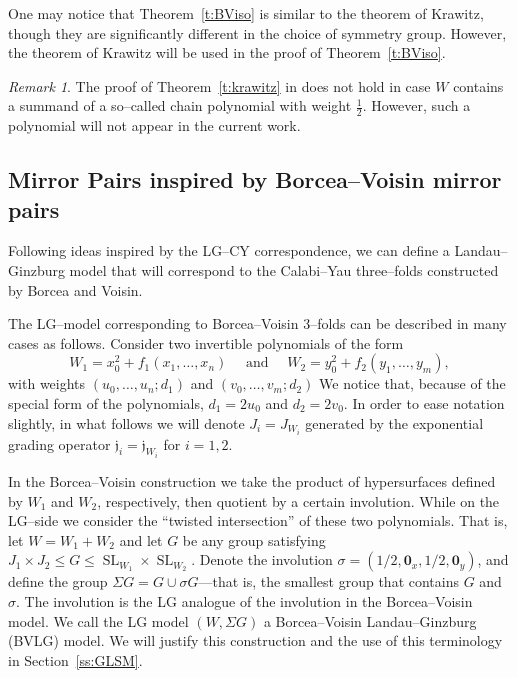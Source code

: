 \documentclass[10pt, letterpaper]{amsart}
\theoremstyle{remark}
\newtheorem{rem}{Remark}[thm]
\newcommand{\jw}{\mathfrak{j}}
\newcommand{\s}[1]{\Sigma #1}
\newcommand{\mb}[1]{\mathbf{#1}}
\DeclareMathOperator{\SL}{SL}
\begin{document}
One may notice that Theorem~\ref{t:BViso} is similar to the theorem of Krawitz, though they are significantly different in the choice of symmetry group. However, the theorem of Krawitz will be used in the proof of Theorem~\ref{t:BViso}.

\begin{rem}
The proof of Theorem~\ref{t:krawitz} in \cite{Kr} does not hold in case $W$ contains a summand of a so--called chain polynomial with weight $\tfrac 12$. However, such a polynomial will not appear in the current work. 
\end{rem}




\subsection{Mirror Pairs inspired by Borcea--Voisin mirror pairs}\label{ss:BVLGmodel}
Following ideas inspired by the LG--CY correspondence, we can define a Landau--Ginzburg model that will correspond to the Calabi--Yau three--folds constructed by Borcea and Voisin. 

The LG--model corresponding to Borcea--Voisin 3--folds can be described in many cases as follows. Consider two invertible polynomials of the form 
\begin{equation}\label{e:wxwy}
W_1=x_0^2+f_1(x_1,\dots,x_n)\quad \text{ and }\quad W_2= y_0^2+f_2(y_1,\dots,y_m), 
\end{equation}
with weights $(u_0,\dots, u_n;d_1)$ and $(v_0,\dots,v_m;d_2)$ We notice that, because of the special form of the polynomials, $d_1 = 2u_0$ and $d_2 = 2v_0$. In order to ease notation slightly, in what follows we will denote $J_i=J_{W_i}$ generated by the exponential grading operator $\jw_i=\jw_{W_i}$ for $i=1,2$.  
 
In the Borcea--Voisin construction we take the product of hypersurfaces defined by $W_1$ and $W_2$, respectively,  then quotient by a certain involution. While on the LG--side we consider the ``twisted intersection'' of these two polynomials. That is, let $W=W_1+W_2$ and let $G$ be any group satisfying $J_1\times J_2\leq G\leq \SL_{W_1}\times \SL_{W_2}$. Denote the involution 
$\sigma=(1/2,\mb{0}_x,1/2,\mb{0}_y)$, and define the group $\s{G}=G\cup \sigma G$---that is, the smallest group that contains $G$ and $\sigma$. The involution is the LG analogue of the involution in the Borcea--Voisin model. We call the LG model $(W,\s{G})$ a Borcea--Voisin Landau--Ginzburg (BVLG) model. We will justify this construction and the use of this terminology in Section~\ref{ss:GLSM}. 
\end{document}
